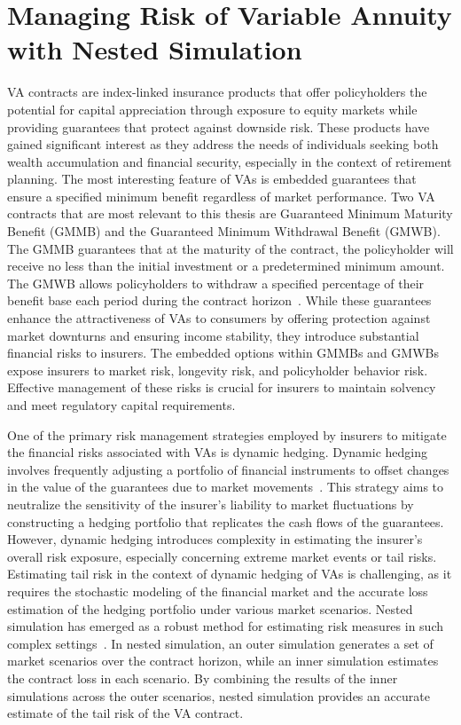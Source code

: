 \section{Managing Risk of Variable Annuity with Nested Simulation}

VA contracts are index-linked insurance products that offer policyholders the potential for capital appreciation through exposure to equity markets while providing guarantees that protect against downside risk.
These products have gained significant interest as they address the needs of individuals seeking both wealth accumulation and financial security, especially in the context of retirement planning.
The most interesting feature of VAs is embedded guarantees that ensure a specified minimum benefit regardless of market performance.
Two VA contracts that are most relevant to this thesis are Guaranteed Minimum Maturity Benefit (GMMB) and the Guaranteed Minimum Withdrawal Benefit (GMWB). 
The GMMB guarantees that at the maturity of the contract, the policyholder will receive no less than the initial investment or a predetermined minimum amount. 
The GMWB allows policyholders to withdraw a specified percentage of their benefit base each period during the contract horizon~\citep{hardy2003investment}.
While these guarantees enhance the attractiveness of VAs to consumers by offering protection against market downturns and ensuring income stability, they introduce substantial financial risks to insurers. 
The embedded options within GMMBs and GMWBs expose insurers to market risk, longevity risk, and policyholder behavior risk. 
Effective management of these risks is crucial for insurers to maintain solvency and meet regulatory capital requirements.

One of the primary risk management strategies employed by insurers to mitigate the financial risks associated with VAs is dynamic hedging. 
Dynamic hedging involves frequently adjusting a portfolio of financial instruments to offset changes in the value of the guarantees due to market movements~\citep{hull2016options}. 
This strategy aims to neutralize the sensitivity of the insurer's liability to market fluctuations by constructing a hedging portfolio that replicates the cash flows of the guarantees.
However, dynamic hedging introduces complexity in estimating the insurer's overall risk exposure, especially concerning extreme market events or tail risks.
Estimating tail risk in the context of dynamic hedging of VAs is challenging, as it requires the stochastic modeling of the financial market and the accurate loss estimation of the hedging portfolio under various market scenarios.
Nested simulation has emerged as a robust method for estimating risk measures in such complex settings~\citep{gordy2010nested}.
In nested simulation, an outer simulation generates a set of market scenarios over the contract horizon, while an inner simulation estimates the contract loss in each scenario.
By combining the results of the inner simulations across the outer scenarios, nested simulation provides an accurate estimate of the tail risk of the VA contract.

